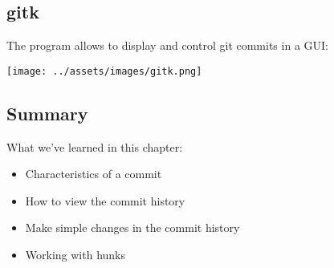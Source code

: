\subsection{gitk}
\begin{frame}[fragile]
  \subslidetitle
  The program  allows to display and control git commits in a GUI:
  \\
  \vspace{1em}
  \centerline{\texttt{[image: ../assets/images/gitk.png]}}
\end{frame}

\subsection{Summary}
\begin{frame}[fragile]
\subslidetitle
  What we've learned in this chapter:
  \begin{itemize}
    \item Characteristics of a commit
    \item How to view the commit history
    \item Make simple changes in the commit history
    \item Working with hunks
  \end{itemize}
\end{frame}
